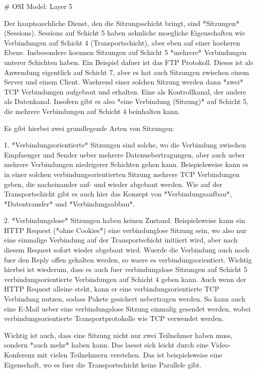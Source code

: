 # OSI Model: Layer 5

Der hauptsaechliche Dienst, den die Sitzungsschicht bringt, sind *Sitzungen*
(Sessions). Sessions auf Schicht 5 haben aehnliche moegliche Eigenschaften wie
Verbindungen auf Schicht 4 (Transportschicht), aber eben auf einer hoeheren
Ebene. Insbesondere koennen Sitzungen auf Schicht 5 *mehrere* Verbindungen
unterer Schichten haben. Ein Beispiel dafuer ist das FTP Protokoll. Dieses ist
als Anwendung eigentlich auf Schicht 7, aber es hat auch Sitzungen zwischen
einem Server und einem Client. Waehrend einer solchen Sitzung werden dann *zwei*
TCP Verbindungen aufgebaut und erhalten. Eine als Kontrollkanal, der andere als
Datenkanal. Insofern gibt es also *eine Verbindung (Sitzung)* auf Schicht 5, die
mehrere Verbindungen auf Schicht 4 beinhalten kann.

Es gibt hierbei zwei grundlegende Arten von Sitzungen:

1. *Verbindungsorientierte* Sitzungen sind solche, wo die Verbindung zwischen
   Empfaenger und Sender ueber mehrere Datenuebertragungen, aber auch ueber
   mehrere Verbindungen niedrigerer Schichten gehen kann. Beispielsweise kann es
   in einer solchen verbindungsorientierten Sitzung mehrere TCP Verbindungen
   geben, die nacheinander auf- und wieder abgebaut werden. Wie auf der
   Transportschicht gibt es auch hier das Konzept von *Verbindungsaufbau*,
   *Datentransfer* und *Verbindungsabbau*.

2. *Verbindungslose* Sitzungen haben keinen Zustand. Beispielsweise kann ein
   HTTP Request (*ohne Cookies*) eine verbindunglose Sitzung sein, wo also nur
   eine einmalige Verbindung auf der Transportschicht initiiert wird, aber nach
   diesem Request sofort wieder abgebaut wird. Wuerde die Verbindung auch noch
   fuer den Reply offen gehalten werden, so waere es
   verbindungsorientiert. Wichtig hierbei ist wiederum, dass es auch fuer
   verbindungslose Sitzungen auf Schicht 5 verbindungsorientierte Verbindungen
   auf Schicht 4 geben kann. Auch wenn der HTTP Request alleine steht, kann er
   eine verbindungsorientierte TCP Verbindung nutzen, sodass Pakete gesichert
   uebertragen werden. So kann auch eine E-Mail ueber eine verbindungslose
   Sitzung einmalig gesendet werden, wobei verbindungsorientierte
   Transportprotokolle wie TCP verwendet werden.

Wichtig ist auch, dass eine Sitzung nicht nur zwei Teilnehmer haben muss,
sondern *auch mehr* haben kann. Das laesst sich leicht durch eine
Video-Konferenz mit vielen Teilnehmern verstehen. Das ist beispielsweise eine
Eigenschaft, wo es fuer die Transportschicht keine Parallele gibt.

